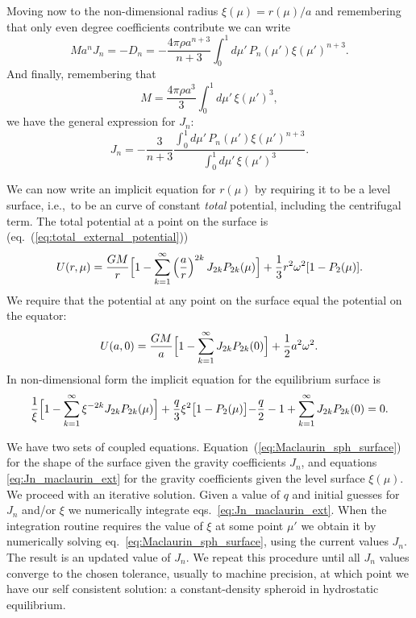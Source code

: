 \documentclass[amsmath,amsfonts,rmp,letterpaper]{revtex4}
\newcommand{\om}{\omega}
\renewcommand{\inf}{\infty}
\begin{document}
Moving now to the non-dimensional radius $\xi(\mu) = r(\mu)/a$ and remembering
that only even degree coefficients contribute we can write
\begin{equation}
Ma^nJ_n = -D_n =
-\frac{4\pi\rho{}a^{n + 3}}{n + 3}\int_{0}^{1}d\mu'\,P_n(\mu')\xi(\mu')^{n + 3}.
\end{equation}
And finally, remembering that
\begin{equation}
M = \frac{4\pi\rho{}a^3}{3}\int_{0}^{1}d\mu'\,\xi(\mu')^3,
\end{equation}
we have the general expression for $J_n$:
\begin{equation}\label{eq:Jn_maclaurin_ext}
J_n = -\frac{3}{n + 3}\frac{\int_{0}^{1}d\mu'\,P_n(\mu')\xi(\mu')^{n+3}}{\int_{0}^
{1}d\mu'\,\xi(\mu')^3}.
\end{equation}

We can now write an implicit equation for $r(\mu)$ by requiring it to be a level
surface, i.e.,~to be an curve of constant \emph{total} potential, including the
centrifugal term. The total potential at a point on the surface is
(eq.~(\ref{eq:total_external_potential}))
\begin{equation}
U(r,\mu) = \frac{GM}{r} \Bigl[ 1 -
\sum_{k=1}^{\infty}\left(\frac{a}{r}\right)^{2k} J_{2k}P_{2k}(\mu) \Bigr] + 
\frac{1}{3}r^2\om^2[1 - P_2(\mu)].
\end{equation}
We require that the potential at any point on the surface equal the potential on
the equator:
\begin{equation}
U(a,0) = \frac{GM}{a} \Bigl[1 - \sum_{k=1}^{\inf} J_{2k}P_{2k}(0) \Bigr] + 
\frac{1}{2}a^2\om^2.
\end{equation}
In non-dimensional form the implicit equation for the equilibrium surface is
\begin{equation}\label{eq:Maclaurin_sph_surface}
\frac{1}{\xi}\Bigl[1 - \sum_{k=1}^{\inf} \xi^{-2k} J_{2k} P_{2k}(\mu)\Bigr] + 
\frac{q}{3}\xi^2\bigl[1 - P_2(\mu)\bigl] - \frac{q}{2} - 1 +
\sum_{k=1}^{\inf}J_{2k}P_{2k}(0) = 0.
\end{equation}

We have two sets of coupled equations. Equation~(\ref{eq:Maclaurin_sph_surface})
for the shape of the surface given the gravity coefficients $J_n$, and equations 
\eqref{eq:Jn_maclaurin_ext} for the gravity coefficients given the level surface
$\xi(\mu)$. We proceed with an iterative solution. Given a value of $q$ and
initial guesses for $J_n$ and/or $\xi$ we numerically integrate
eqs.~\eqref{eq:Jn_maclaurin_ext}. When the integration routine requires the value
of $\xi$ at some point $\mu'$ we obtain it by numerically solving
eq.~\eqref{eq:Maclaurin_sph_surface}, using the current values $J_n$. The result
is an updated value of $J_n$. We repeat this procedure until all $J_n$ values
converge to the chosen tolerance, usually to machine precision, at which point we
have our self consistent solution: a constant-density spheroid in hydrostatic
equilibrium.
\end{document}
